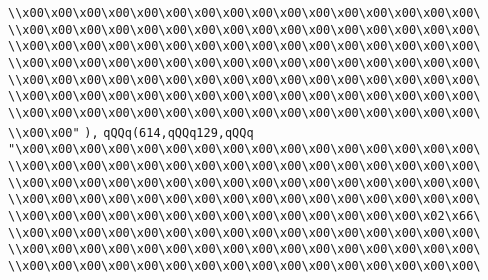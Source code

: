 \verb|\\x00\x00\x00\x00\x00\x00\x00\x00\x00\x00\x00\x00\x00\x00\x00\x00\|\newline
\verb|\\x00\x00\x00\x00\x00\x00\x00\x00\x00\x00\x00\x00\x00\x00\x00\x00\|\newline
\verb|\\x00\x00\x00\x00\x00\x00\x00\x00\x00\x00\x00\x00\x00\x00\x00\x00\|\newline
\verb|\\x00\x00\x00\x00\x00\x00\x00\x00\x00\x00\x00\x00\x00\x00\x00\x00\|\newline
\verb|\\x00\x00\x00\x00\x00\x00\x00\x00\x00\x00\x00\x00\x00\x00\x00\x00\|\newline
\verb|\\x00\x00\x00\x00\x00\x00\x00\x00\x00\x00\x00\x00\x00\x00\x00\x00\|\newline
\verb|\\x00\x00\x00\x00\x00\x00\x00\x00\x00\x00\x00\x00\x00\x00\x00\x00\|\newline
\verb|\\x00\x00"|\newline
\verb|),|\newline
\verb|qQQq(614,qQQq129,qQQq|\newline
\verb|"\x00\x00\x00\x00\x00\x00\x00\x00\x00\x00\x00\x00\x00\x00\x00\x00\|\newline
\verb|\\x00\x00\x00\x00\x00\x00\x00\x00\x00\x00\x00\x00\x00\x00\x00\x00\|\newline
\verb|\\x00\x00\x00\x00\x00\x00\x00\x00\x00\x00\x00\x00\x00\x00\x00\x00\|\newline
\verb|\\x00\x00\x00\x00\x00\x00\x00\x00\x00\x00\x00\x00\x00\x00\x00\x00\|\newline
\verb|\\x00\x00\x00\x00\x00\x00\x00\x00\x00\x00\x00\x00\x00\x00\x02\x66\|\newline
\verb|\\x00\x00\x00\x00\x00\x00\x00\x00\x00\x00\x00\x00\x00\x00\x00\x00\|\newline
\verb|\\x00\x00\x00\x00\x00\x00\x00\x00\x00\x00\x00\x00\x00\x00\x00\x00\|\newline
\verb|\\x00\x00\x00\x00\x00\x00\x00\x00\x00\x00\x00\x00\x00\x00\x00\x00\|\newline
